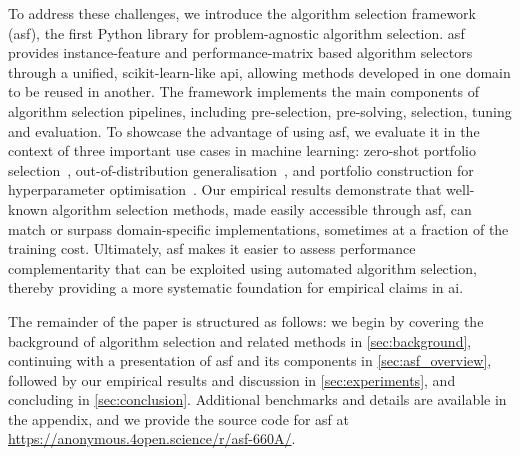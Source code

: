 To address these challenges, we introduce the algorithm selection framework (\gls{asf}), the first Python library for problem-agnostic algorithm selection.
\Gls{asf} provides instance-feature and performance-matrix based algorithm selectors through a unified, scikit-learn-like \gls{api}, allowing methods developed in one domain to be reused in another.
The framework implements the main components of algorithm selection pipelines, including pre-selection, pre-solving, selection, tuning and evaluation.
To showcase the advantage of using \gls{asf}, we evaluate it in the context of three important use cases in machine learning: 
zero-shot portfolio selection~\citep{OztEtAl22}, out-of-distribution generalisation~\citep{JiaEtAl25}, and portfolio construction for hyperparameter optimisation~\citep{EggEtAl21}.
Our empirical results demonstrate that well-known algorithm selection methods, made easily accessible through \gls{asf}, can match or surpass domain-specific implementations, sometimes at a fraction of the training cost. Ultimately, \gls{asf} makes it easier to assess performance complementarity that can be exploited using automated algorithm selection, thereby providing a more systematic foundation for empirical claims in \gls{ai}.

The remainder of the paper is structured as follows: we begin by covering the background of algorithm selection and related methods in \autoref{sec:background}, continuing with a presentation of \gls{asf} and its components in \autoref{sec:asf_overview}, followed by our empirical results and discussion in \autoref{sec:experiments}, and concluding in \autoref{sec:conclusion}. Additional benchmarks and details are available in the appendix, and we provide the source code for \gls{asf} at \url{https://anonymous.4open.science/r/asf-660A/}.


